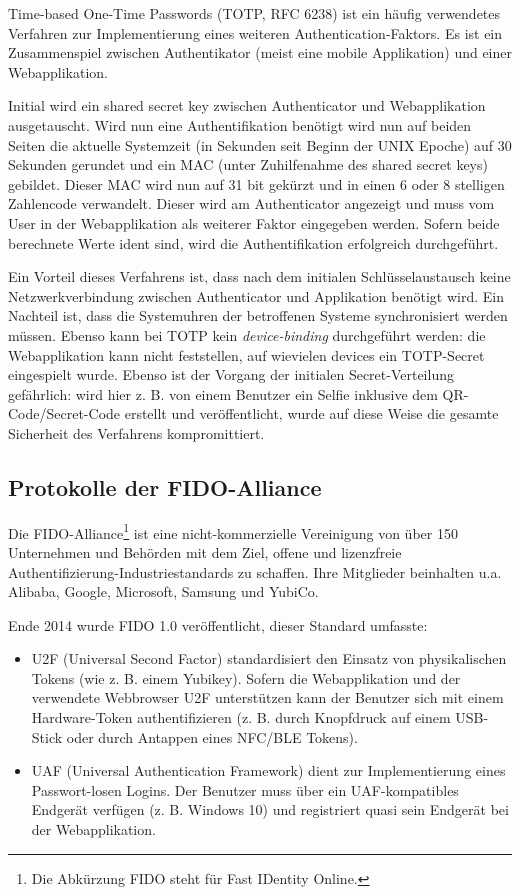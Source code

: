 Time-based One-Time Passwords (TOTP, RFC 6238) ist ein häufig verwendetes Verfahren zur Implementierung eines weiteren Authentication-Faktors. Es ist ein Zusammenspiel zwischen Authentikator (meist eine mobile Applikation) und einer Webapplikation.

Initial wird ein shared secret key zwischen Authenticator und Webapplikation ausgetauscht. Wird nun eine Authentifikation benötigt wird nun auf beiden Seiten die aktuelle Systemzeit (in Sekunden seit Beginn der UNIX Epoche) auf 30 Sekunden gerundet und ein MAC (unter Zuhilfenahme des shared secret keys) gebildet. Dieser MAC wird nun auf 31 bit gekürzt und in einen 6 oder 8 stelligen Zahlencode verwandelt. Dieser wird am Authenticator angezeigt und muss vom User in der Webapplikation als weiterer Faktor eingegeben werden. Sofern beide berechnete Werte ident sind, wird die Authentifikation erfolgreich durchgeführt.

Ein Vorteil dieses Verfahrens ist, dass nach dem initialen Schlüsselaustausch keine Netzwerkverbindung zwischen Authenticator und Applikation benötigt wird. Ein Nachteil ist, dass die Systemuhren der betroffenen Systeme synchronisiert werden müssen. Ebenso kann bei TOTP kein \textit{device-binding} durchgeführt werden: die Webapplikation kann nicht feststellen, auf wievielen devices ein TOTP-Secret eingespielt wurde. Ebenso ist der Vorgang der initialen Secret-Verteilung gefährlich: wird hier z. B. von einem Benutzer ein Selfie inklusive dem QR-Code/Secret-Code erstellt und veröffentlicht, wurde auf diese Weise die gesamte Sicherheit des Verfahrens kompromittiert.

\subsection{Protokolle der FIDO-Alliance}

Die FIDO-Alliance\footnote{Die Abkürzung FIDO steht für Fast IDentity Online.} ist eine nicht-kommerzielle Vereinigung von über 150 Unternehmen und Behörden mit dem Ziel, offene und lizenzfreie Authentifizierung-Industriestandards zu schaffen. Ihre Mitglieder beinhalten u.a. Alibaba, Google, Microsoft, Samsung und YubiCo.

Ende 2014 wurde FIDO 1.0 veröffentlicht, dieser Standard umfasste:

\begin{itemize}
	\item U2F (Universal Second Factor) standardisiert den Einsatz von physikalischen Tokens (wie z. B. einem Yubikey). Sofern die Webapplikation und der verwendete Webbrowser U2F unterstützen kann der Benutzer sich mit einem Hardware-Token authentifizieren (z. B. durch Knopfdruck auf einem USB-Stick oder durch Antappen eines NFC/BLE Tokens).
	\item UAF (Universal Authentication Framework) dient zur Implementierung eines Passwort-losen Logins. Der Benutzer muss über ein UAF-kompatibles Endgerät verfügen (z. B. Windows 10) und registriert quasi sein Endgerät bei der Webapplikation.
\end{itemize}

